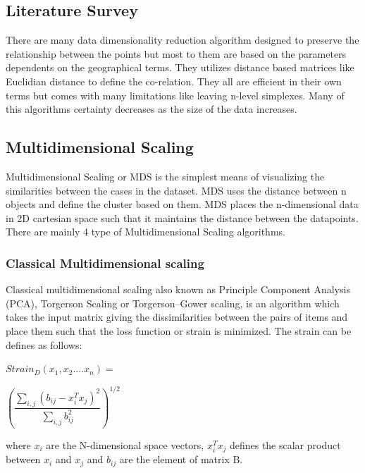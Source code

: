\documentclass[11pt, a4paper]{article}
\begin{document}
\begin{multicols}{2}
    \section{Literature Survey}
        There are many data dimensionality reduction algorithm designed to preserve the relationship between the points but most to them are based on the parameters dependents on the geographical terms. They utilizes distance based matrices like Euclidian distance to define the co-relation. They all are efficient in their own terms but comes with many limitations like leaving n-level simplexes. Many of this algorithms certainty decreases as the size of the data increases.

        \subsection{Multidimensional Scaling}
            Multidimensional Scaling or MDS is the simplest means of visualizing the similarities between the cases in the dataset. MDS uses the distance between n objects and define the cluster based on them. MDS places the n-dimensional data in 2D cartesian space such that it maintains the distance between the datapoints. There are mainly 4 type of Multidimensional Scaling algorithms.
            \subsubsection{Classical Multidimensional scaling}
                Classical multidimensional scaling also known as Principle Component Analysis (PCA), Torgerson Scaling or Torgerson–Gower scaling, is an algorithm which takes the input matrix giving the dissimilarities between the pairs of items and place them such that the loss function or strain is minimized. The strain can be defines as follows:
                \medskip
                \begin{flushleft}
                    \begin{math}
                        Strain_{D}(x_{1},x_{2}....x_{n} ) =
                    \end{math}
                \end{flushleft}
                \begin{flushright}
                    \begin{math}
                        \left(\dfrac{\sum_{i,j} (b_{ij} - x_{i}^{T}x_{j})^{2}}{\sum_{i,j}b_{ij}^{2}}\right) ^{1/2}
                    \end{math}
                \end{flushright}
                where \(x_{i}\) are the N-dimensional space vectors, \(x_{i}^{T}x_{j}\) defines the scalar product between \(x_{i}\) and \(x_{j}\) and \(b_{ij}\) are the element of matrix B.   

\end{multicols}
\end{document}
